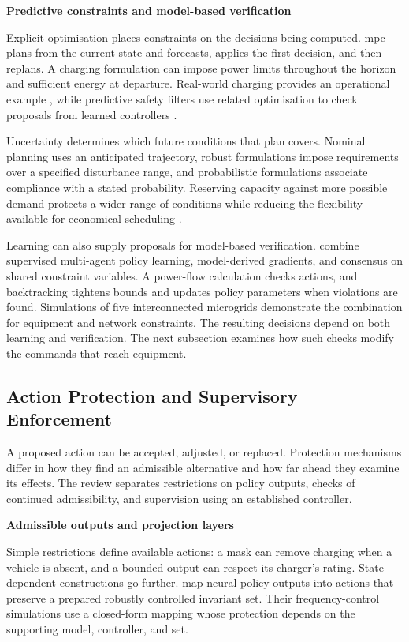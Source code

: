 \smallskip
\noindent\textbf{Predictive constraints and model-based verification}\par\nobreak\smallskip
Explicit optimisation places constraints on the decisions being computed. \gls{mpc} plans from the current state and forecasts, applies the first decision, and then replans. A charging formulation can impose power limits throughout the horizon and sufficient energy at departure. Real-world charging provides an operational example \parencite{hermans2024mpc}, while predictive safety filters use related optimisation to check proposals from learned controllers \parencite{wabersich2021predictive}.

Uncertainty determines which future conditions that plan covers. Nominal planning uses an anticipated trajectory, robust formulations impose requirements over a specified disturbance range, and probabilistic formulations associate compliance with a stated probability. Reserving capacity against more possible demand protects a wider range of conditions while reducing the flexibility available for economical scheduling \parencite{wabersich2021predictive,muntwiler2020distributed}.

Learning can also supply proposals for model-based verification. \textcite{zhang2021safemicrogrids} combine supervised multi-agent policy learning, model-derived gradients, and consensus on shared constraint variables. A power-flow calculation checks actions, and backtracking tightens bounds and updates policy parameters when violations are found. Simulations of five interconnected microgrids demonstrate the combination for equipment and network constraints. The resulting decisions depend on both learning and verification. The next subsection examines how such checks modify the commands that reach equipment.

\subsection{Action Protection and Supervisory Enforcement}
\label{sec:ch3-action-protection}
\label{sec:ch2-safety-literature}

A proposed action can be accepted, adjusted, or replaced. Protection mechanisms differ in how they find an admissible alternative and how far ahead they examine its effects. The review separates restrictions on policy outputs, checks of continued admissibility, and supervision using an established controller.

\smallskip
\noindent\textbf{Admissible outputs and projection layers}\par\nobreak\smallskip
Simple restrictions define available actions: a mask can remove charging when a vehicle is absent, and a bounded output can respect its charger's rating. State-dependent constructions go further. \textcite{tabas2022efficient} map neural-policy outputs into actions that preserve a prepared robustly controlled invariant set. Their frequency-control simulations use a closed-form mapping whose protection depends on the supporting model, controller, and set.

